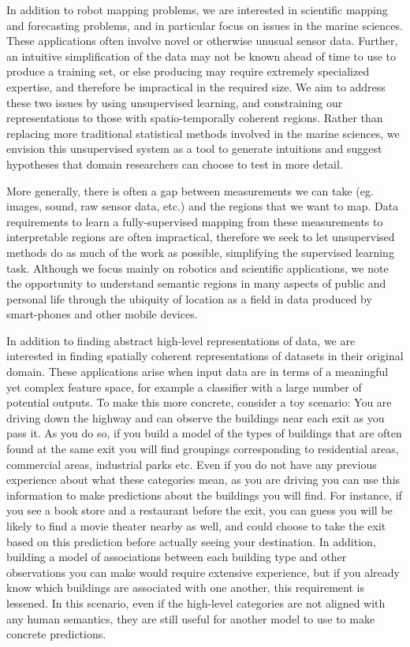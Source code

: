 In addition to robot mapping problems, we are interested in scientific mapping and forecasting problems, and in particular focus on issues in the marine sciences. These applications often involve novel or otherwise unusual sensor data. Further, an intuitive simplification of the data may not be known ahead of time to use to produce a training set, or else producing may require extremely specialized expertise, and therefore be impractical in the required size. We aim to address these two issues by using unsupervised learning, and constraining our representations to those with spatio-temporally coherent regions. Rather than replacing more traditional statistical methods involved in the marine sciences, we envision this unsupervised system as a tool to generate intuitions and suggest hypotheses that domain researchers can choose to test in more detail.

More generally, there is often a gap between measurements we can take (eg. images, sound, raw sensor data, etc.) and the regions that we want to map. Data requirements to learn a fully-supervised mapping from these measurements to interpretable regions are often impractical, therefore we seek to let unsupervised methods do as much of the work as possible, simplifying the supervised learning task. Although we focus mainly on robotics and scientific applications, we note the opportunity to understand semantic regions in many aspects of public and personal life through the ubiquity of location as a field in data produced by smart-phones and other mobile devices.

In addition to finding abstract high-level representations of data, we are interested in finding spatially coherent representations of datasets in their original domain. These applications arise when input data are in terms of a meaningful yet complex feature space, for example a classifier with a large number of potential outputs. To make this more concrete, consider a toy scenario: You are driving down the highway and can observe the buildings near each exit as you pass it. As you do so, if you build a model of the types of buildings that are often found at the same exit you will find groupings corresponding to residential areas, commercial areas, industrial parks etc. Even if you do not have any previous experience about what these categories mean, as you are driving you can use this information to make predictions about the buildings you will find. For instance, if you see a book store and a restaurant before the exit, you can guess you will be likely to find a movie theater nearby as well, and could choose to take the exit based on this prediction before actually seeing your destination.
In addition, building a model of associations between each building type and other observations you can make would require extensive experience, but if you already know which buildings are associated with one another, this requirement is lessened. In this scenario, even if the high-level categories are not aligned with any human semantics, they are still useful for another model to use to make concrete predictions.

